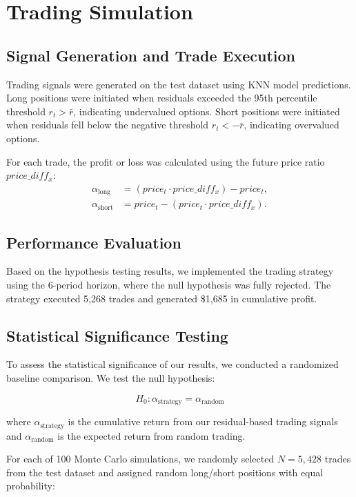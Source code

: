 \documentclass{article}
\begin{document}
\section{Trading Simulation}

\subsection{Signal Generation and Trade Execution}

Trading signals were generated on the test dataset using KNN model predictions. Long positions were initiated when residuals exceeded the 95th percentile threshold $r_t > \bar{r}$, indicating undervalued options. Short positions were initiated when residuals fell below the negative threshold $r_t < -\bar{r}$, indicating overvalued options.

For each trade, the profit or loss was calculated using the future price ratio $price\_diff_x$:
\begin{align*}
\alpha_{\text{long}} &= (price_t \cdot price\_diff_x) - price_t,\\
\alpha_{\text{short}} &= price_t - (price_t \cdot price\_diff_x).
\end{align*}

\subsection{Performance Evaluation}

Based on the hypothesis testing results, we implemented the trading strategy using the 6-period horizon, where the null hypothesis was fully rejected. The strategy executed 5,268 trades and generated \$1,685 in cumulative profit.

\subsection{Statistical Significance Testing}

To assess the statistical significance of our results, we conducted a randomized baseline comparison. We test the null hypothesis:

\[
H_0: \alpha_{\text{strategy}} = \alpha_{\text{random}}
\]

where $\alpha_{\text{strategy}}$ is the cumulative return from our residual-based trading signals and $\alpha_{\text{random}}$ is the expected return from random trading.

For each of 100 Monte Carlo simulations, we randomly selected $N = 5,428$ trades from the test dataset and assigned random long/short positions with equal probability:
\end{document}

